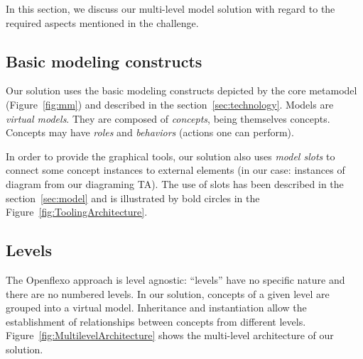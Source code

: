 In this section, we discuss our multi-level model solution with regard to the required aspects
mentioned in the challenge.


  \subsection{Basic modeling constructs}


  Our solution uses the basic modeling constructs depicted by the \FML core
  metamodel (Figure~\ref{fig:mm}) and described in
  the section~\ref{sec:technology}. Models are \emph{virtual models}. They are
  composed of \emph{concepts}, being themselves concepts. Concepts may have
  \emph{roles} and \emph{behaviors} (actions one can perform).

  In order to provide the graphical tools, our solution also uses \emph{model
  slots} to connect some concept instances to external elements (in our case:
  instances of diagram from our diagraming TA). The use of slots has been
  described in the section~\ref{sec:model} and is illustrated by bold circles in
  the Figure~\ref{fig:ToolingArchitecture}.


  \subsection{Levels}


  The Openflexo approach is level agnostic: ``levels'' have no specific nature
  and there are no numbered levels. In our solution, concepts of a given level
  are grouped into a virtual model. Inheritance and instantiation allow the
  establishment of relationships between concepts from different levels.
Figure~\ref{fig:MultilevelArchitecture} shows the multi-level architecture of
our solution.


